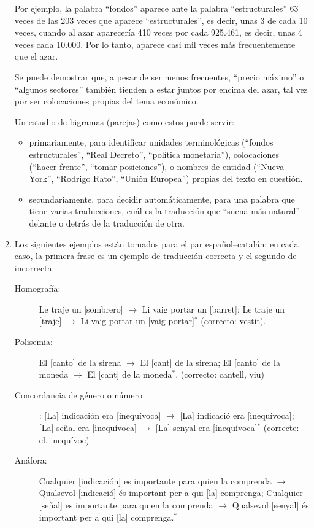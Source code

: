 \begin{enumerate}
Por ejemplo, la palabra ``fondos'' aparece ante la palabra ``estructurales'' 63 veces de las 203 veces que aparece ``estructurales'', es decir, unas 3 de cada 10 veces, cuando al azar aparecería 410 veces por cada 925.461, es decir, unas 4 veces cada 10.000. Por lo tanto, aparece casi mil veces más frecuentemente que el azar. 

Se puede demostrar que, a pesar de ser menos frecuentes, ``precio máximo'' o ``algunos sectores'' también tienden a estar juntos por encima del azar, tal vez por ser colocaciones propias del tema económico. 

Un estudio de bigramas (parejas) como estos puede servir: 

\begin{itemize} \item primariamente, para identificar unidades terminológicas (``fondos estructurales'', ``Real Decreto'', ``política monetaria''), colocaciones (``hacer frente'', ``tomar posiciones''), o nombres de entidad (``Nueva York'', ``Rodrigo Rato'', ``Unión Europea'') propias del texto en cuestión. 

\item secundariamente, para decidir automáticamente, para una palabra que tiene varias traducciones, cuál es la traducción que ``suena más natural'' delante o detrás de la traducción de otra. \end{itemize} 

\item Los siguientes ejemplos están tomados para el par español--catalán; en cada caso, la primera frase es un ejemplo de traducción correcta y el segundo de incorrecta: \begin{description} \item[Homografía:] Le traje un [sombrero] $\rightarrow$ Li vaig portar un [barret]; Le traje un [traje] $\rightarrow$ Li vaig portar un [vaig portar]$^*$ (correcto: vestit). \item[Polisemia:] El [canto] de la sirena $\rightarrow$ El [cant] de la sirena; El [canto] de la moneda $\rightarrow$ El [cant] de la moneda$^*$. (correcto: cantell, viu) \item[Concordancia de género o número]: [La] indicación era [inequívoca] $\rightarrow$ [La] indicació era [inequívoca]; [La] señal era [inequívoca] $\rightarrow$ [La] senyal era [inequívoca]$^*$ (correcte: el, inequívoc) \item[Anáfora:] Cualquier [indicación] es importante para quien la comprenda $\rightarrow$ Qualsevol [indicació] és important per a qui [la] comprenga; Cualquier [señal] es importante para quien la comprenda $\rightarrow$ Qualsevol [senyal] és important per a qui [la] comprenga.$^*$ \end{description} 


\end{enumerate}
